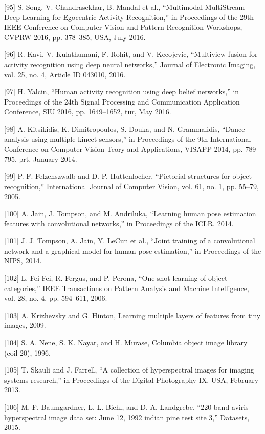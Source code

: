 \documentclass[a4paper]{article}
\begin{document}
[95] S. Song, V. Chandrasekhar, B. Mandal et al., “Multimodal MultiStream Deep Learning for Egocentric Activity Recognition,” in
Proceedings of the 29th IEEE Conference on Computer Vision
and Pattern Recognition Workshops, CVPRW 2016, pp. 378–385,
USA, July 2016.


[96] R. Kavi, V. Kulathumani, F. Rohit, and V. Kecojevic, “Multiview
fusion for activity recognition using deep neural networks,”
Journal of Electronic Imaging, vol. 25, no. 4, Article ID 043010,
2016.


[97] H. Yalcin, “Human activity recognition using deep belief networks,” in Proceedings of the 24th Signal Processing and Communication Application Conference, SIU 2016, pp. 1649–1652, tur,
May 2016.


[98] A. Kitsikidis, K. Dimitropoulos, S. Douka, and N. Grammalidis,
“Dance analysis using multiple kinect sensors,” in Proceedings of
the 9th International Conference on Computer Vision Teory and
Applications, VISAPP 2014, pp. 789–795, prt, January 2014.


[99] P. F. Felzenszwalb and D. P. Huttenlocher, “Pictorial structures for object recognition,” International Journal of Computer
Vision, vol. 61, no. 1, pp. 55–79, 2005.


[100] A. Jain, J. Tompson, and M. Andriluka, “Learning human pose
estimation features with convolutional networks,” in Proceedings of the ICLR, 2014.


[101] J. J. Tompson, A. Jain, Y. LeCun et al., “Joint training of a convolutional network and a graphical model for human pose
estimation,” in Proceedings of the NIPS, 2014.


[102] L. Fei-Fei, R. Fergus, and P. Perona, “One-shot learning of object
categories,” IEEE Transactions on Pattern Analysis and Machine
Intelligence, vol. 28, no. 4, pp. 594–611, 2006.


[103] A. Krizhevsky and G. Hinton, Learning multiple layers of features from tiny images, 2009.


[104] S. A. Nene, S. K. Nayar, and H. Murase, Columbia object image
library (coil-20), 1996.


[105] T. Skauli and J. Farrell, “A collection of hyperspectral images for
imaging systems research,” in Proceedings of the Digital Photography IX, USA, February 2013.


[106] M. F. Baumgardner, L. L. Biehl, and D. A. Landgrebe, “220 band
aviris hyperspectral image data set: June 12, 1992 indian pine test
site 3,” Datasets, 2015.
\end{document}
